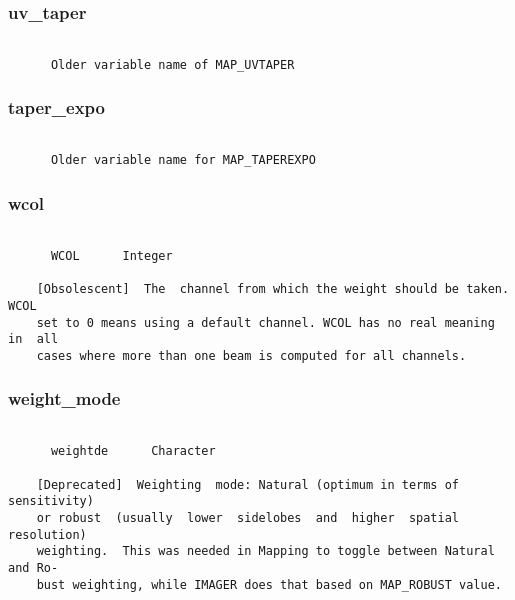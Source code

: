 \subsubsection{uv\_taper}
\begin{verbatim}

      Older variable name of MAP_UVTAPER

\end{verbatim}
\subsubsection{taper\_expo}
\begin{verbatim}

      Older variable name for MAP_TAPEREXPO

\end{verbatim}
\subsubsection{wcol}
\begin{verbatim}

      WCOL      Integer

    [Obsolescent]  The  channel from which the weight should be taken.  WCOL
    set to 0 means using a default channel. WCOL has no real meaning in  all
    cases where more than one beam is computed for all channels.

\end{verbatim}
\subsubsection{weight\_mode}
\begin{verbatim}

      weightde      Character

    [Deprecated]  Weighting  mode: Natural (optimum in terms of sensitivity)
    or robust  (usually  lower  sidelobes  and  higher  spatial  resolution)
    weighting.  This was needed in Mapping to toggle between Natural and Ro-
    bust weighting, while IMAGER does that based on MAP_ROBUST value.







\end{verbatim}
